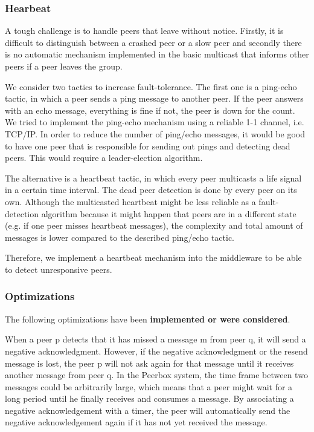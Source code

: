 \subsubsection{Hearbeat}
A tough challenge is to handle peers that leave without notice. Firstly, it is difficult to distinguish between a crashed peer or a slow peer and  secondly there is no automatic mechanism implemented in the basic multicast that informs other peers if a peer leaves the group.

We consider two tactics to increase fault-tolerance. The first one is a ping-echo tactic, in which a peer sends a ping message to another peer. If the peer answers with an echo message, everything is fine if not, the peer is down for the count. We tried to implement the ping-echo mechanism using a reliable 1-1 channel, i.e. TCP/IP. In order to reduce the number of ping/echo messages, it would be good to have one peer that is responsible for sending out pings and detecting dead peers. This would require a leader-election algorithm.

The alternative is a heartbeat tactic, in which every peer multicasts a life signal in a certain time interval. The dead peer detection is done by every peer on its own. Although the multicasted heartbeat might be less reliable as a fault-detection algorithm because it might happen that peers are in a different state (e.g. if one peer misses heartbeat messages), the complexity and total amount of messages is lower compared to the described ping/echo tactic.

Therefore, we implement a heartbeat mechanism into the middleware to be able to detect unresponsive peers.

\subsubsection{Optimizations}
The following optimizations have been \textbf{implemented or were considered}. 

When a peer p detects that it has missed a message m from peer q, it will send a negative acknowledgment. However, if the negative acknowledgment or the resend message is lost, the peer p will not ask again for that message until it receives another message from peer q. 
In the Peerbox system, the time frame between two messages could be arbitrarily large, which means that a peer might wait for a long period until he finally receives and consumes a message. 
By associating a negative acknowledgement with a timer, the peer will automatically send the negative acknowledgement again if it has not yet received the message.

